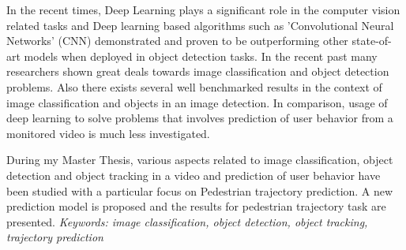 % 
% 
%

In the recent times, Deep Learning plays a significant role in the computer vision
related tasks and Deep learning based algorithms such as 'Convolutional Neural Networks'
(CNN) demonstrated and proven to be outperforming other state-of-art models when 
deployed in object detection tasks. In the recent past many researchers shown great 
deals towards image classification and object detection problems. Also there exists several 
well benchmarked results in the context of image classification and objects in an image detection.
In comparison, usage of deep learning to solve problems that involves prediction of 
user behavior from a monitored video is much less investigated.

\vspace{1em}
\noindent During my Master Thesis, various aspects related to image classification, object 
detection and object tracking in a video and prediction of user behavior 
have been studied with a particular focus on Pedestrian trajectory prediction. 
A new prediction model is proposed and the results for pedestrian trajectory 
task are presented.
\baselineskip
\textit{Keywords: image classification, object detection, object tracking, trajectory prediction}
